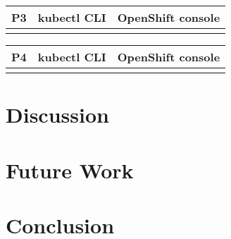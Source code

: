 \documentclass[11pt, oneside]{article}   	%
\begin{document}
\begin{center}
\begin{tabular}{ | c | c | c | } 
  \hline
  P3 & kubectl CLI & OpenShift console \\ 
  \hline
   &  &  \\ 
  \hline
\end{tabular}
\end{center}

\begin{center}
\begin{tabular}{ | c | c | c | } 
  \hline
  P4 & kubectl CLI & OpenShift console \\ 
  \hline
   &  &  \\ 
  \hline
\end{tabular}
\end{center}

\section{Discussion}

\section{Future Work}

\section{Conclusion}



\end{document}
